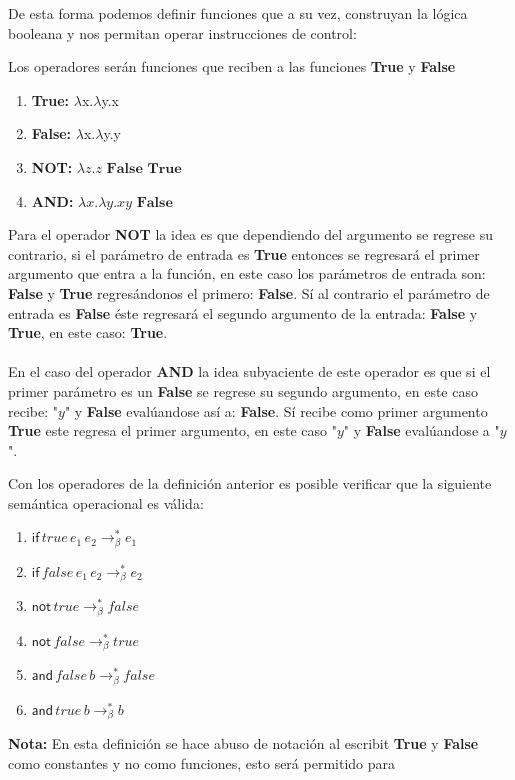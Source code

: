     De esta forma podemos definir funciones que a su vez, construyan la lógica booleana y nos permitan operar instrucciones de control:
    \begin{definition} Los operadores serán funciones que reciben a las funciones \textbf{True} y \textbf{False}\\
        \begin{enumerate}
            \item \textbf{True:} $\lambda$x.$\lambda$y.x 
            \item \textbf{False:}  $\lambda$x.$\lambda$y.y 
            \item \textbf{NOT:} $\lambda z. z \textbf{ False }\textbf{True}$ 
            \item \textbf{AND:}  $\lambda x.\lambda y. xy\textbf{ False}$ 
        \end{enumerate} 
    \end{definition}

    Para el operador \textbf{NOT} la idea es que dependiendo del argumento se regrese su contrario, si el parámetro de entrada es \textbf{True} entonces se regresará el primer argumento que entra a la función, en este caso los parámetros de entrada son: \textbf{False} y \textbf{True} regresándonos el primero: \textbf{False}. Sí al contrario el parámetro de entrada es \textbf{False} éste regresará el segundo argumento de la entrada: \textbf{False} y \textbf{True}, en este caso: \textbf{True}.\\\\
    En el caso del operador \textbf{AND} la idea subyaciente de este operador es que si el primer parámetro es un \textbf{False} se regrese su segundo argumento, en este caso recibe: "$y$" y \textbf{False} evalúandose así a: \textbf{False}. Sí recibe como primer argumento \textbf{True} este regresa el primer argumento, en este caso "$y$" y \textbf{False} evalúandose a "$y$".

    \begin{definition}
        Con los operadores de la definición anterior es posible verificar que la siguiente semántica operacional es válida:
        \begin{enumerate}
            \item $\mathsf{if}\,true\,e_1\,e_2 \to_\beta^* e_1$ 
            \item $\mathsf{if}\,false\,e_1\,e_2 \to_\beta^* e_2$ 
            \item $\mathsf{not}\,true\to_\beta^* false$
            \item $\mathsf{not}\,false\to_\beta^* true$
            \item $\mathsf{and}\,false\,b\to_\beta^* false$
            \item $\mathsf{and}\,true\,b\to_\beta^* b$
        \end{enumerate}
        \textbf{Nota:} En esta definición se hace abuso de notación al escribit \textbf{True} y  \textbf{False} como constantes y no como funciones, esto será permitido para 
     \end{definition}

